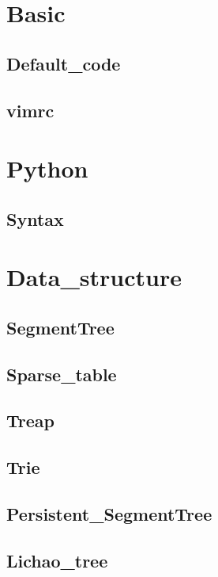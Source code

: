\section{Basic}
    \subsection{Default\_code}
        
    \subsection{vimrc}
        
\section{Python}
    \subsection{Syntax}
        

\section{Data\_structure}
    \subsection{SegmentTree}
        
    \subsection{Sparse\_table}
        
    \subsection{Treap}
        
    \subsection{Trie}
        
    \subsection{Persistent\_SegmentTree}
        
    \subsection{Lichao\_tree}
        


